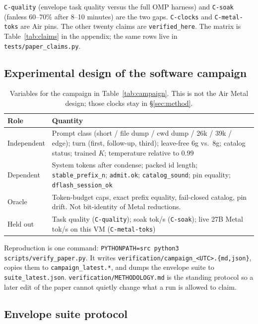 \texttt{C-quality} (envelope task quality versus the full OMP harness) and \texttt{C-soak} (fanless 60--70\% after 8--10 minutes) are the two gaps. \texttt{C-clocks} and \texttt{C-metal-toks} are Air pins. The other twenty claims are \texttt{verified\_here}. The matrix is Table~\ref{tab:claims} in the appendix; the same rows live in \texttt{tests/paper\_claims.py}.

\subsection{Experimental design of the software campaign}

\begin{table}[ht]
\centering
\caption{Variables for the campaign in Table~\ref{tab:campaign}. This is not the Air Metal design; those clocks stay in \S\ref{sec:method}.}
\label{tab:ivdv}
\begin{tabular}{@{}p{3.2cm}p{10.0cm}@{}}
\toprule
Role & Quantity \\
\midrule
Independent & Prompt class (short / file dump / cwd dump / 26k / 39k / edge); turn (first, follow-up, third); leave-free 6g vs.\ 8g; catalog status; trained $K$; temperature relative to $0.99$ \\
Dependent & System tokens after condense; packed id length; \texttt{stable\_prefix\_n}; \texttt{admit.ok}; \texttt{catalog\_sound}; pin equality; \texttt{dflash\_session\_ok} \\
Oracle & Token-budget caps, exact prefix equality, fail-closed catalog, pin drift. Not bit-identity of Metal reductions. \\
Held out & Task quality (\texttt{C-quality}); soak tok/s (\texttt{C-soak}); live 27B Metal tok/s on this VM (\texttt{C-metal-toks}) \\
\bottomrule
\end{tabular}
\end{table}

Reproduction is one command: \texttt{PYTHONPATH=src python3 scripts/verify\_paper.py}. It writes \texttt{verification/campaign\_<UTC>.\{md,json\}}, copies them to \texttt{campaign\_latest.*}, and dumps the envelope suite to \texttt{suite\_latest.json}. \texttt{verification/METHODOLOGY.md} is the standing protocol so a later edit of the paper cannot quietly change what a run is allowed to claim.

\subsection{Envelope suite protocol}
\label{sec:suite-proto}

